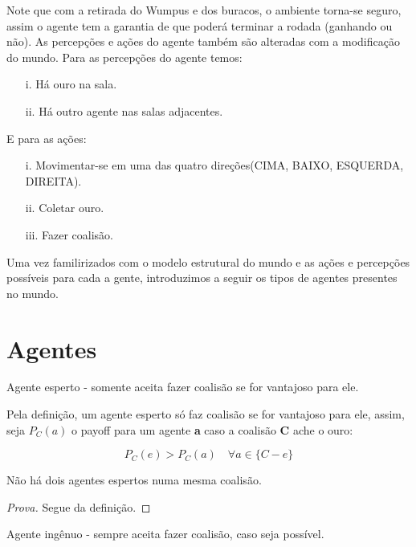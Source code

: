 \documentclass[11pt,reqno]{article}
\begin{document}
Note que com a retirada do Wumpus e dos buracos, o ambiente torna-se seguro, assim o agente tem a garantia de que poderá terminar a rodada (ganhando ou não).
As percepções e ações do agente também são alteradas com a modificação do mundo. Para as percepções do agente temos:

\begin{itemize}
\item[i.] Há ouro na sala.
\item[ii.] Há outro agente nas salas adjacentes.
\end{itemize}

E para as ações:

\begin{itemize}
\item[i.] Movimentar-se em uma das quatro direções(CIMA, BAIXO, ESQUERDA, DIREITA).
\item[ii.] Coletar ouro.
\item[iii.] Fazer coalisão.
\end{itemize}

Uma vez familirizados com o modelo estrutural do mundo e as ações e percepções possíveis para cada a gente, introduzimos a seguir os tipos de agentes presentes no mundo.

\section{Agentes}

\begin{definition}
 Agente esperto - somente aceita fazer coalisão se for vantajoso para ele.
\end{definition}

Pela definição, um agente esperto só faz coalisão se for vantajoso para ele, assim, seja $P_C(a)$ o payoff para um agente \textbf{a} caso a coalisão \textbf{C} ache o ouro:

$$P_C(e) > P_C(a) \quad \forall a \in \{C - e\}$$

\begin{theorem}
 Não há dois agentes espertos numa mesma coalisão.
\end{theorem}

\begin{proof}[Prova]
Segue da definição.
\end{proof}

\begin{definition}
 Agente ingênuo - sempre aceita fazer coalisão, caso seja possível.
\end{definition}
\end{document}
